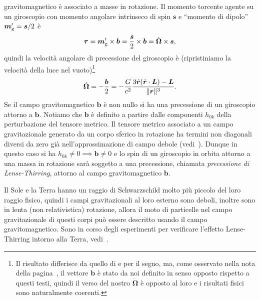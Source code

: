 gravitomagnetico è associato a masse in rotazione.  Il momento torcente agente
su un giroscopio con momento angolare intrinseco di spin $\bm{s}$ e ``momento di
dipolo'' $\bm{m}_{\textup{g}}' = \bm{s}/2$ è
\begin{equation}
  \bm{\tau} = \bm{m}_{\textup{g}}' \times \bm{b} = \frac{\bm{s}}{2} \times
  \bm{b} = \dot{\bm{\Omega}} \times \bm{s},
\end{equation}
quindi la velocità angolare di precessione del giroscopio è (ripristiniamo la
velocità della luce nel
vuoto)\footnote{Il risultato differisce da quello di
  \textcite[321]{ciufolini:gravitation} e \textcite[193]{ohanian:gravitazione}
  per il segno, ma, come osservato nella nota della pagina~\pageref{nota-b}, il
  vettore $\bm{b}$ è stato da noi definito in senso opposto rispetto a questi
  testi, quindi il verso del nostro $\dot{\bm{\Omega}}$ è opposto al loro e i
  risultati fisici sono naturalmente coerenti.}
\begin{equation}
  \dot{\bm{\Omega}} = -\frac{\bm{b}}{2} =
  -\frac{G}{c^{2}}\frac{3\hat{\bm{r}}(\hat{\bm{r}} \cdot \bm{L}) -
    \bm{L}}{\lVert\bm{r}\rVert^{3}}.
\end{equation}
Se il campo gravitomagnetico $\bm{b}$ è non nullo si ha una precessione di un
giroscopio attorno a $\bm{b}$.  Notiamo che $\bm{b}$ è definito a partire dalle
componenti $h_{0k}$ della perturbazione del tensore metrico.  Il tensore metrico
associato a un campo gravitazionale generato da un corpo sferico in rotazione ha
termini non diagonali diversi da zero già nell'approssimazione di campo debole
(vedi~\textcite[192]{ohanian:gravitazione}).  Dunque in questo caso si ha
$h_{0k} \neq 0 \implies \bm{b} \neq 0$ e lo spin di un giroscopio in orbita
attorno a una massa in rotazione sarà soggetto a una precessione, chiamata
 \emph{precessione di Lense-Thirring},
attorno al campo gravitomagnetico $\bm{b}$.

Il Sole e la Terra hanno un raggio di Schwarzschild molto più piccolo del loro
raggio fisico, quindi i campi gravitazionali al loro esterno sono deboli,
inoltre sono in lenta (non relativistica) rotazione, allora il moto di
particelle nel campo gravitazionale di questi corpi può essere descritto usando
il campo gravitomagnetico.  Sono in corso degli esperimenti per verificare
l'effetto Lense-Thirring intorno alla Terra,
vedi~\textcite[193-195]{ohanian:gravitazione}.

